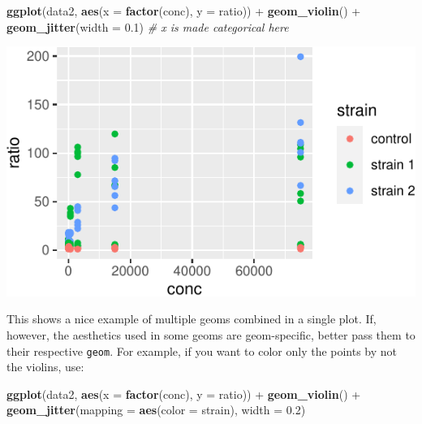 \documentclass[]{book}
\newenvironment{Shaded}{}{}
\newcommand{\CommentTok}[1]{\textcolor[rgb]{0.38,0.63,0.69}{\textit{#1}}}
\newcommand{\DataTypeTok}[1]{\textcolor[rgb]{0.56,0.13,0.00}{#1}}
\newcommand{\FloatTok}[1]{\textcolor[rgb]{0.25,0.63,0.44}{#1}}
\newcommand{\KeywordTok}[1]{\textcolor[rgb]{0.00,0.44,0.13}{\textbf{#1}}}
\newcommand{\NormalTok}[1]{#1}
\newcommand{\OperatorTok}[1]{\textcolor[rgb]{0.40,0.40,0.40}{#1}}
\newcommand{\StringTok}[1]{\textcolor[rgb]{0.25,0.44,0.63}{#1}}
\begin{document}
\begin{Shaded}
\begin{Highlighting}[]
\KeywordTok{ggplot}\NormalTok{(data2, }\KeywordTok{aes}\NormalTok{(}\DataTypeTok{x =} \KeywordTok{factor}\NormalTok{(conc), }\DataTypeTok{y =}\NormalTok{ ratio)) }\OperatorTok{+}
\StringTok{  }\KeywordTok{geom_violin}\NormalTok{() }\OperatorTok{+}
\StringTok{  }\KeywordTok{geom_jitter}\NormalTok{(}\DataTypeTok{width =} \FloatTok{0.1}\NormalTok{)}
 \CommentTok{# x is made categorical here}
\end{Highlighting}
\end{Shaded}

\begin{center}\includegraphics[width=\textwidth]{TRES-Tidy-Tutorial_files/figure-latex/unnamed-chunk-121-1} \end{center}

This shows a nice example of multiple geoms combined in a single plot. If, however, the aesthetics used in some geoms are geom-specific, better pass them to their respective \texttt{geom}. For example, if you want to color only the points by not the violins, use:

\begin{Shaded}
\begin{Highlighting}[]
\KeywordTok{ggplot}\NormalTok{(data2, }\KeywordTok{aes}\NormalTok{(}\DataTypeTok{x =} \KeywordTok{factor}\NormalTok{(conc), }\DataTypeTok{y =}\NormalTok{ ratio)) }\OperatorTok{+}
\StringTok{  }\KeywordTok{geom_violin}\NormalTok{() }\OperatorTok{+}
\StringTok{  }\KeywordTok{geom_jitter}\NormalTok{(}\DataTypeTok{mapping =} \KeywordTok{aes}\NormalTok{(}\DataTypeTok{color =}\NormalTok{ strain), }\DataTypeTok{width =} \FloatTok{0.2}\NormalTok{)}
\end{Highlighting}
\end{Shaded}
\end{document}
